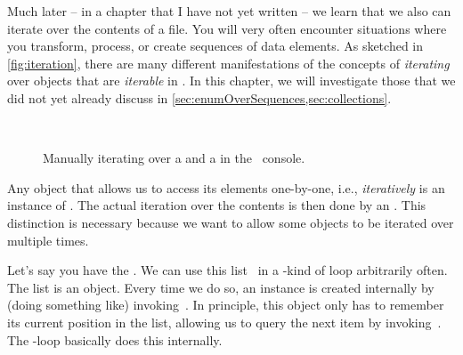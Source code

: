 Much later -- in a chapter that I have not yet written -- we learn that we also can iterate over the contents of a file.
You will very often encounter situations where you transform, process, or create sequences of data elements.
As sketched in \cref{fig:iteration}, there are many different manifestations of the concepts of \emph{iterating} over objects that are \emph{iterable} in \python.
In this chapter, we will investigate those that we did not yet already discuss in \cref{sec:enumOverSequences,sec:collections}.
%
%
%
\begin{figure}%
\centering%
%
%
%
\\[12pt]%
%
%
%
%
\caption{Manually iterating over a  and a  in the \python~console.}%
\label{fig:iterateOverListAndRange}%
\end{figure}%
%
\begin{sloppypar}%
Any object that allows us to access its elements one-by-one, i.e., \emph{iteratively} is an instance of .
The actual iteration over the contents is then done by an .
This distinction is necessary because we want to allow some objects to be iterated over multiple times.%
\end{sloppypar}%
%
Let's say you have the  .
We can use this list~ in a -kind of loop arbitrarily often.
The list is an  object.
Every time we do so, an  instance is created internally by (doing something like) invoking~.
In principle, this  object only has to remember its current position in the list, allowing us to query the next item by invoking~.
The -loop basically does this internally.%
%
\endhsection%
%
\endhsection%
%
